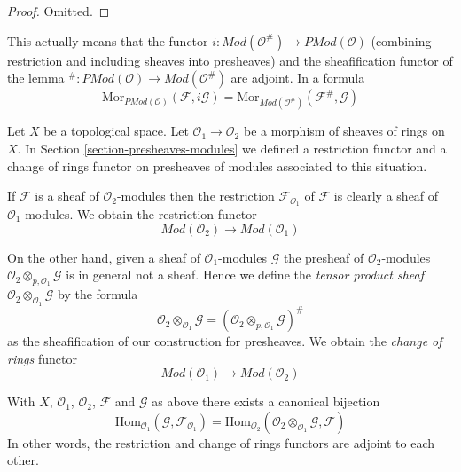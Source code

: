 \begin{proof}
Omitted.
\end{proof}

\noindent
This actually means that the functor
$i : \textit{Mod}(\mathcal{O}^\#) \to \textit{PMod}(\mathcal{O})$
(combining restriction and including sheaves into presheaves)
and the sheafification functor of the lemma
${}^\# : \textit{PMod}(\mathcal{O}) \to \textit{Mod}(\mathcal{O}^\#)$
are adjoint. In a formula
$$
\text{Mor}_{\textit{PMod}(\mathcal{O})}(\mathcal{F}, i\mathcal{G})
=
\text{Mor}_{\textit{Mod}(\mathcal{O}^\#)}(\mathcal{F}^\#, \mathcal{G})
$$

\medskip\noindent
Let $X$ be a topological space.
Let $\mathcal{O}_1 \to \mathcal{O}_2$ be
a morphism of sheaves of rings on $X$.
In Section \ref{section-presheaves-modules}
we defined a restriction functor
and a change of rings functor on presheaves of modules
associated to this situation.

\medskip\noindent
If $\mathcal{F}$ is a sheaf of $\mathcal{O}_2$-modules
then the restriction $\mathcal{F}_{\mathcal{O}_1}$
of $\mathcal{F}$ is clearly a sheaf
of $\mathcal{O}_1$-modules. We obtain the restriction functor
$$
\textit{Mod}(\mathcal{O}_2)
\longrightarrow
\textit{Mod}(\mathcal{O}_1)
$$

\medskip\noindent
On the other hand, given a sheaf of $\mathcal{O}_1$-modules
$\mathcal{G}$ the presheaf of $\mathcal{O}_2$-modules
$\mathcal{O}_2 \otimes_{p,\mathcal{O}_1} \mathcal{G}$
is in general not a sheaf. Hence we define the
{\it tensor product sheaf}
$\mathcal{O}_2 \otimes_{\mathcal{O}_1} \mathcal{G}$
by the formula
$$
\mathcal{O}_2 \otimes_{\mathcal{O}_1} \mathcal{G}
=
(\mathcal{O}_2 \otimes_{p,\mathcal{O}_1} \mathcal{G})^\#
$$
as the sheafification of our construction for presheaves.
We obtain the {\it change of rings} functor
$$
\textit{Mod}(\mathcal{O}_1)
\longrightarrow
\textit{Mod}(\mathcal{O}_2)
$$

\begin{lemma}
\label{lemma-adjointness-tensor-restrict}
With $X$, $\mathcal{O}_1$, $\mathcal{O}_2$, $\mathcal{F}$ and
$\mathcal{G}$ as above there exists a canonical bijection
$$
\text{Hom}_{\mathcal{O}_1}(\mathcal{G}, \mathcal{F}_{\mathcal{O}_1})
=
\text{Hom}_{\mathcal{O}_2}(
\mathcal{O}_2 \otimes_{\mathcal{O}_1} \mathcal{G},
\mathcal{F}
)
$$
In other words, the restriction and change of rings functors
are adjoint to each other.
\end{lemma}

